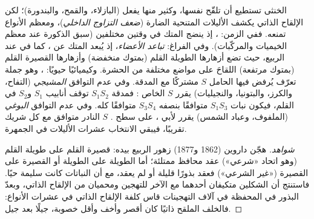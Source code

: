 \begin{proposition}\label{prop:b2:angiosperm-reproduction:selfing}
 الخنثى تستطيع أن تلقّح نفسها، وكثير منها يفعل (البازلاء،
والقمح، والبندورة)؛ لكن الإلقاح الذاتي يكشف الأليلات المتنحية
الضارة (\emph{ضعف التزاوج الداخلي})، ومعظم الأنواع تمنعه. ففي الزمن:
\emph{}، إذ ينضج المتك  في وقتين مختلفين (سبق
الذكورة عند معظم الخيميات والمركّبات). وفي الفراغ:
\emph{تباعد الأعضاء}، إذ يُبعد المتك عن ، كما في
\emph{} عند  الربيع، حيث تضع أزهارها الطويلة القلم
(بمتوك منخفضة) وأزهارها القصيرة القلم (بمتوك مرتفعة) اللقاحَ
على مواضع مختلفة من الحشرة. وكيميائيًا حيويًا:
\emph{}، وهو جملة تعرّف يُرفض فيها  الحامل
 $S$ مشتركًا مع المدقة. وفي عدم التوافق \emph{المشيجي}
(التفاح، والكرز، والبتونيا، والنجيليات) يقرر  $S$ 
الخاص : فمدقة $S_1S_2$ توقف أنابيب $S_1$ و$S_2$ في القلم،
فيكون  نبات $S_1S_3$ متوافقًا بنصفه  $S_3S_4$ متوافقًا كله.
وفي عدم التوافق \emph{البوغي} (الملفوف، وعباد الشمس) يقرر   لأبي ، على سطح .  $S$
النادر متوافق مع كل شريك تقريبًا، فيبقي الانتخاب عشرات الأليلات في
الجمهرة.
\end{proposition}
\begin{proof}[شواهد]
هجّن داروين (1862 و1877) زهور الربيع بيده:   قصيرة القلم
على   طويلة القلم (وهو اتحاد «شرعي») عقد محافظ ممتلئة؛ أما
الطويلة على الطويلة أو القصيرة على القصيرة («غير الشرعي») فعقد بذورًا
قليلة أو لم يعقد، مع أن النباتات كانت سليمة  حيًا. فاستنتج
أن الشكلين متكيفان أحدهما مع الآخر للتهجين ومحميان من الإلقاح
الذاتي، وبعدّ البذور في المحفظة في آلاف التهجينات قاس كلفة الإلقاح
الذاتي في عشرات الأنواع: فالخلف الملقح ذاتيًا كان أقصر وأخف وأقل
خصوبة، جيلًا بعد جيل.
\end{proof}

